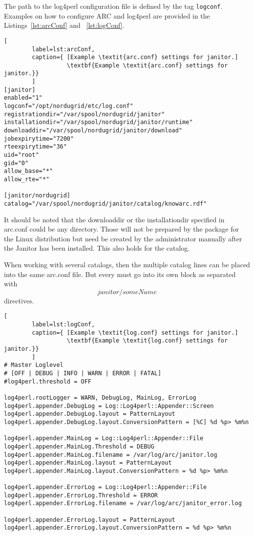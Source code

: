 The path to the log4perl configuration file is defined by the tag
\texttt{logconf}.  Examples on how to configure ARC and log4perl are
provided in the Listings~\ref{lst:arcConf} and ~\ref{lst:logConf}.


\begin{lstlisting}[
        label=lst:arcConf,
        caption={ [Example \textit{arc.conf} settings for janitor.]
                  \textbf{Example \textit{arc.conf} settings for janitor.}}
        ]
[janitor]
enabled="1"
logconf="/opt/nordugrid/etc/log.conf"
registrationdir="/var/spool/nordugrid/janitor"
installationdir="/var/spool/nordugrid/janitor/runtime"
downloaddir="/var/spool/nordugrid/janitor/download"
jobexpirytime="7200"
rteexpirytime="36"
uid="root"
gid="0"
allow_base="*"
allow_rte="*"

[janitor/nordugrid]
catalog="/var/spool/nordugrid/janitor/catalog/knowarc.rdf"
\end{lstlisting}

It should be noted that the downloaddir or the installationdir specified
in arc.conf could be any directory. Those will not be prepared by the
package for the Linux distribution but need be created by the administrator
manually after the Janitor has been installed. This also holds for the
catalog.

When working with several catalogs, then the multiple catalog lines can
be placed into the same arc.conf file. But every must go into its own block
as separated with \[janitor/someName\] directives.

\begin{lstlisting}[
        label=lst:logConf,
        caption={ [Example \textit{log.conf} settings for janitor.]
                  \textbf{Example \textit{log.conf} settings for janitor.}}
        ]
# Master Loglevel
# [OFF | DEBUG | INFO | WARN | ERROR | FATAL]
#log4perl.threshold = OFF

log4perl.rootLogger = WARN, DebugLog, MainLog, ErrorLog
log4perl.appender.DebugLog = Log::Log4perl::Appender::Screen
log4perl.appender.DebugLog.layout = PatternLayout
log4perl.appender.DebugLog.layout.ConversionPattern = [%C] %d %p> %m%n

log4perl.appender.MainLog = Log::Log4perl::Appender::File
log4perl.appender.MainLog.Threshold = DEBUG
log4perl.appender.MainLog.filename = /var/log/arc/janitor.log
log4perl.appender.MainLog.layout = PatternLayout
log4perl.appender.MainLog.layout.ConversionPattern = %d %p> %m%n

log4perl.appender.ErrorLog = Log::Log4perl::Appender::File
log4perl.appender.ErrorLog.Threshold = ERROR
log4perl.appender.ErrorLog.filename = /var/log/arc/janitor_error.log

log4perl.appender.ErrorLog.layout = PatternLayout
log4perl.appender.ErrorLog.layout.ConversionPattern = %d %p> %m%n
\end{lstlisting}


